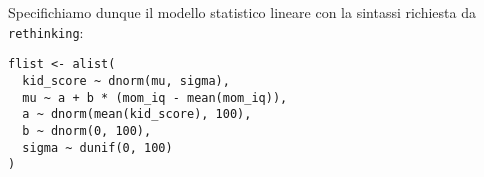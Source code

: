 %

Specifichiamo dunque il modello statistico lineare con la sintassi richiesta da \verb+rethinking+:




\begin{lstlisting}
flist <- alist(
  kid_score ~ dnorm(mu, sigma),
  mu ~ a + b * (mom_iq - mean(mom_iq)),
  a ~ dnorm(mean(kid_score), 100),
  b ~ dnorm(0, 100),
  sigma ~ dunif(0, 100)
)
\end{lstlisting}
 


